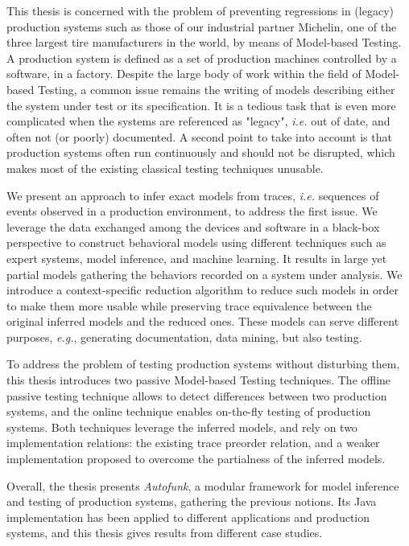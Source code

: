 This thesis is concerned with the problem of preventing
regressions in (legacy) production systems such as those of our
industrial partner Michelin, one of the three largest tire
manufacturers in the world, by means of Model-based Testing. A
production system is defined as a set of production machines
controlled by a software, in a factory.  Despite the large body
of work within the field of Model-based Testing, a common issue
remains the writing of models describing either the system under
test or its specification. It is a tedious task that is even more
complicated when the systems are referenced as "legacy",
\emph{i.e.} out of date, and often not (or poorly) documented. A
second point to take into account is that production systems
often run continuously and should not be disrupted, which makes
most of the existing classical testing techniques unusable.

We present an approach to infer exact models from traces,
\emph{i.e.} sequences of events observed in a production
environment, to address the first issue. We leverage the data
exchanged among the devices and software in a black-box
perspective to construct behavioral models using different
techniques such as expert systems, model inference, and machine
learning. It results in large yet partial models gathering the
behaviors recorded on a system under analysis. We introduce a
context-specific reduction algorithm to reduce such models in
order to make them more usable while preserving trace equivalence
between the original inferred models and the reduced ones. These
models can serve different purposes, \emph{e.g.}, generating
documentation, data mining, but also testing.

To address the problem of testing production systems without
disturbing them, this thesis introduces two passive Model-based
Testing techniques. The offline passive testing technique allows
to detect differences between two production systems, and the
online technique enables on-the-fly testing of production
systems. Both techniques leverage the inferred models, and rely
on two implementation relations: the existing trace preorder
relation, and a weaker implementation proposed to overcome the
partialness of the inferred models.

Overall, the thesis presents \emph{Autofunk}, a modular framework
for model inference and testing of production systems, gathering
the previous notions. Its Java implementation has been applied to
different applications and production systems, and this thesis
gives results from different case studies.
